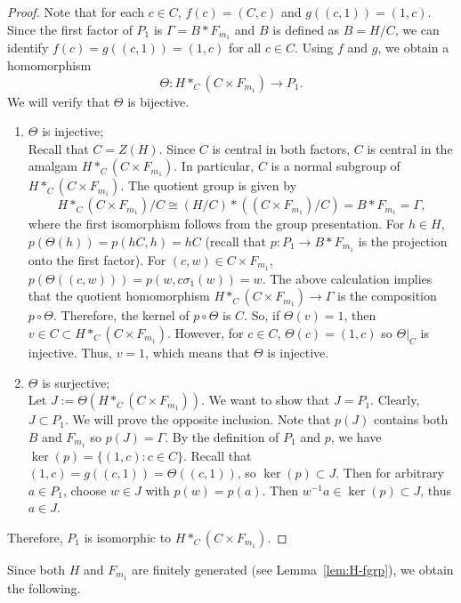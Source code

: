 \documentclass[11pt]{amsart}
\theoremstyle{definition}
\begin{document}
\begin{proof}
 Note that for each $c \in C$, $f(c)=(C,c)$ and $g\left((c,1)\right)=(1,c)$.
 Since the first factor of $P_1$ is $\Gamma = B * F_{m_1}$ and $B$ is defined as $B=H/C$, we can identify $f(c)=g\left((c,1)\right)=(1,c)$ for all $c \in C$.
 Using $f$ and $g$, we obtain a homomorphism 
 $$\Theta: H*_C(C \times F_{m_1} ) \to P_1.$$
 We will verify that $\Theta$ is bijective.
 \begin{enumerate}
    \item $\Theta$ is injective; \\
    Recall that $C=Z(H)$. Since $C$ is central in both factors, $C$ is central in the amalgam $H*_C(C \times F_{m_1} )$.
    In particular, $C$ is a normal subgroup of $H*_C(C \times F_{m_1} )$.
    The quotient group is given by
    $$ H*_C(C \times F_{m_1} ) / C \cong (H/C)* \left ((C \times F_{m_1})/C \right)=B*F_{m_1}=\Gamma,$$
    where the first isomorphism follows from the group presentation.
    For $h \in H$, $p(\Theta(h))=p(hC,h)=hC$ (recall that $p:P_1 \to B*F_{m_1}$ is the projection onto the first factor).
    For $(c,w) \in C \times F_{m_1}$, $p\left(\Theta\left( (c,w) \right)\right)=p(w,c \sigma_1(w))=w$.
    The above calculation implies that the quotient homomorphism $H*_C(C \times F_{m_1} ) \to \Gamma$ is the composition $p \circ \Theta$.
    Therefore, the kernel of $p \circ \Theta$ is $C$.
    So, if $\Theta(v)=1$, then $v \in C \subset H*_C(C \times F_{m_1} )$.
    However, for $c \in C$, $\Theta(c)=(1,c)$ so $\Theta|_C$ is injective.
    Thus, $v=1$, which means that $\Theta$ is injective.
    \item $\Theta$ is surjective; \\
    Let $J:=\Theta(H*_C(C \times F_{m_1} ))$. We want to show that $J=P_1$.
    Clearly, $J \subset P_1$. 
    We will prove the opposite inclusion.
    Note that $p(J)$ contains both $B$ and $F_{m_1}$ so $p(J) = \Gamma$.
    By the definition of $P_1$ and $p$, we have $\ker(p)=\{ (1,c) : c \in C \}.$
    Recall that $ (1,c)=g\left( (c,1) \right)=\Theta \left( (c,1) \right)$, so 
    $\ker(p) \subset J$.
    Then for arbitrary $a \in P_1$, choose $w \in J$ with $p(w)=p(a)$.
    Then $w^{-1}a \in \ker(p) \subset J$, thus $a \in J$.
 \end{enumerate}
 Therefore, $P_1$ is isomorphic to $H*_C(C \times F_{m_1} )$.
 \end{proof}

 Since both $H$ and $F_{m_1}$ are finitely generated (see Lemma~\ref{lem:H-fgrp}), we obtain the following.

\pagebreak
\end{document}

